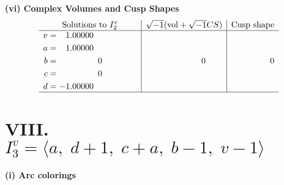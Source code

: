 \documentclass[1p]{elsarticle_modified}
\theoremstyle{definition}
\newcommand{\I}{\sqrt{-1}}
\begin{document}
\newpage\flushleft \textbf{(vi) Complex Volumes and Cusp Shapes}
$$\begin{array}{c|c|c}  
\text{Solutions to }I^v_{2}& \I (\text{vol} + \sqrt{-1}CS) & \text{Cusp shape}\\
 \hline 
\begin{aligned}
v &= \phantom{-}1.00000\phantom{ +0.000000I} \\
a &= \phantom{-}1.00000\phantom{ +0.000000I} \\
b &= \phantom{-0.000000 } 0 \\
c &= \phantom{-0.000000 } 0 \\
d &= -1.00000\phantom{ +0.000000I}\end{aligned}
 & \phantom{-0.000000 } 0 & \phantom{-0.000000 } 0\\
 \hline 
 \end{array}$$\newpage\newpage\renewcommand{\arraystretch}{1}
\centering \section*{VIII. $I^v_{3}= \langle a,\;d+1,\;c+a,\;b-1,\;v-1 \rangle$}
\flushleft \textbf{(i) Arc colorings}\\
\end{document}
